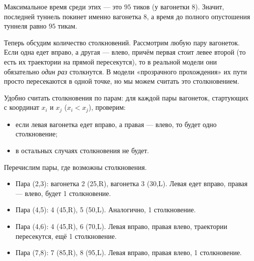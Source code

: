\documentclass[12pt,a4paper]{article}
\begin{document}
Максимальное время среди этих --- это $95$ тиков (у вагонетки 8). Значит, последней туннель покинет именно вагонетка 8, а время до полного опустошения туннеля равно $95$ тикам.

Теперь обсудим количество столкновений. Рассмотрим любую пару вагонеток. Если одна едет вправо, а другая --- влево, причём первая стоит левее второй (то есть их траектории на прямой пересекутся), то в реальной модели они обязательно \emph{один раз} столкнутся. В модели «прозрачного прохождения» их пути просто пересекаются в одной точке, но мы можем считать это столкновением.

Удобно считать столкновения по парам: для каждой пары вагонеток, стартующих с координат $x_i$ и $x_j$ ($x_i < x_j$), проверим:
\begin{itemize}
  \item если левая вагонетка едет вправо, а правая --- влево, то будет одно столкновение;
  \item в остальных случаях столкновения не будет.
\end{itemize}

Перечислим пары, где возможны столкновения.

\begin{itemize}
  \item Пара (2,3): вагонетка 2 (25,R), вагонетка 3 (30,L). Левая едет вправо, правая --- влево, будет 1 столкновение.
  \item Пара (4,5): 4 (45,R), 5 (50,L). Аналогично, 1 столкновение.
  \item Пара (4,6): 4 (45,R), 6 (70,L). Левая вправо, правая влево, траектории пересекутся, ещё 1 столкновение.
  \item Пара (7,8): 7 (85,R), 8 (95,L). Левая вправо, правая влево, 1 столкновение.
\end{itemize}
\end{document}
